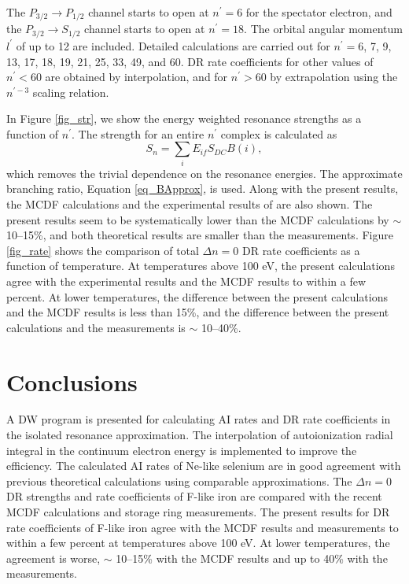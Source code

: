 \documentclass{elsart}
\begin{document}
The $P_{3/2}\to P_{1/2}$ channel starts to open at $n^\prime = 6$ for the
spectator electron, and the $P_{3/2}\to S_{1/2}$ channel starts to open at
$n^\prime = 18$. The orbital angular momentum $l^\prime$ of up to 12 are
included. Detailed calculations are carried out for $n^\prime =$6, 7, 9, 13,
17, 18, 19, 21, 25, 33, 49, and 60. DR rate coefficients for other values of
$n^\prime < 60$ are obtained by interpolation, and for $n^\prime > 60$ by
extrapolation using the $n^{\prime-3}$ scaling relation. 

In Figure \ref{fig_str}, we show the energy weighted resonance strengths as a
function of $n^\prime$. The strength for an entire $n^\prime$ complex is
calculated as 
\begin{equation}
S_n = \sum_i E_{if}S_{DC}B(i),
\end{equation}
which removes the trivial dependence on the resonance energies. The approximate
branching ratio, Equation \ref{eq_BApprox}, is used. 
Along with the present results, the MCDF calculations and the experimental
results of \citet{savin99} are also shown. The present results seem to be
systematically lower than the MCDF calculations by $\sim$ 10--15\%, and 
both theoretical results are smaller than the measurements. 
Figure \ref{fig_rate} shows the comparison of total $\Delta n = 0$ DR rate
coefficients as a function of temperature. At temperatures above 100 eV, the
present calculations agree with the experimental results and the MCDF results
to within a few percent. At lower temperatures, the difference between the
present calculations and the MCDF results is less than 15\%, and the difference
between the present calculations and the measurements is $\sim$ 10--40\%.

\section{Conclusions}
A DW program is presented for calculating AI rates and DR rate
coefficients in the isolated resonance approximation. The interpolation of
autoionization radial integral in the continuum electron energy is implemented
to improve the efficiency. The calculated AI rates of Ne-like selenium are
in good agreement with previous theoretical calculations using comparable
approximations.  
The $\Delta n = 0$ DR strengths and rate coefficients of F-like iron are
compared with the recent MCDF calculations and storage ring measurements. 
The present results for DR rate coefficients of F-like iron agree with the
MCDF results and measurements to within a few percent at temperatures above
100 eV. At lower temperatures, the agreement is worse, $\sim$ 10--15\% with
the MCDF results and up to 40\% with the measurements.
\end{document}
